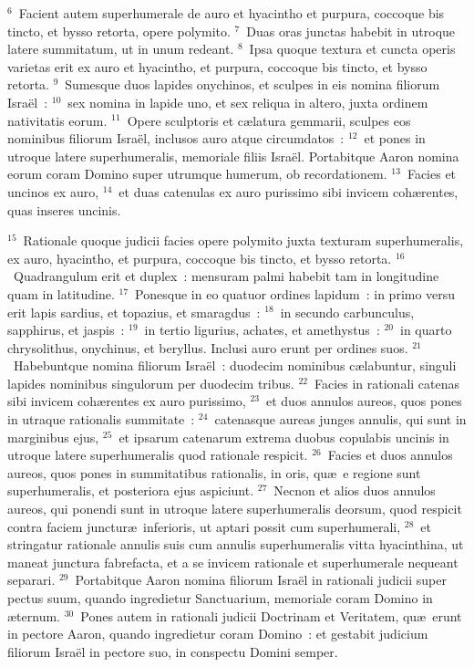 ${}^{6}$~Facient autem superhumerale de auro et hyacintho et purpura, coccoque bis tincto, et bysso retorta, opere polymito.
${}^{7}$~Duas oras junctas habebit in utroque latere summitatum, ut in unum redeant.
${}^{8}$~Ipsa quoque textura et cuncta operis varietas erit ex auro et hyacintho, et purpura, coccoque bis tincto, et bysso retorta.
${}^{9}$~Sumesque duos lapides onychinos, et sculpes in eis nomina filiorum Isra\"el~:
${}^{10}$~sex nomina in lapide uno, et sex reliqua in altero, juxta ordinem nativitatis eorum.
${}^{11}$~Opere sculptoris et c\ae latura gemmarii, sculpes eos nominibus filiorum Isra\"el, inclusos auro atque circumdatos~:
${}^{12}$~et pones in utroque latere superhumeralis, memoriale filiis Isra\"el. Portabitque Aaron nomina eorum coram Domino super utrumque humerum, ob recordationem.
${}^{13}$~Facies et uncinos ex auro,
${}^{14}$~et duas catenulas ex auro purissimo sibi invicem coh\ae rentes, quas inseres uncinis.


${}^{15}$~Rationale quoque judicii facies opere polymito juxta texturam superhumeralis, ex auro, hyacintho, et purpura, coccoque bis tincto, et bysso retorta.
${}^{16}$~Quadrangulum erit et duplex~: mensuram palmi habebit tam in longitudine quam in latitudine.
${}^{17}$~Ponesque in eo quatuor ordines lapidum~: in primo versu erit lapis sardius, et topazius, et smaragdus~:
${}^{18}$~in secundo carbunculus, sapphirus, et jaspis~:
${}^{19}$~in tertio ligurius, achates, et amethystus~:
${}^{20}$~in quarto chrysolithus, onychinus, et beryllus. Inclusi auro erunt per ordines suos.
${}^{21}$~Habebuntque nomina filiorum Isra\"el~: duodecim nominibus c\ae labuntur, singuli lapides nominibus singulorum per duodecim tribus.
${}^{22}$~Facies in rationali catenas sibi invicem coh\ae rentes ex auro purissimo,
${}^{23}$~et duos annulos aureos, quos pones in utraque rationalis summitate~:
${}^{24}$~catenasque aureas junges annulis, qui sunt in marginibus ejus,
${}^{25}$~et ipsarum catenarum extrema duobus copulabis uncinis in utroque latere superhumeralis quod rationale respicit.
${}^{26}$~Facies et duos annulos aureos, quos pones in summitatibus rationalis, in oris, qu\ae\ e regione sunt superhumeralis, et posteriora ejus aspiciunt.
${}^{27}$~Necnon et alios duos annulos aureos, qui ponendi sunt in utroque latere superhumeralis deorsum, quod respicit contra faciem junctur\ae\ inferioris, ut aptari possit cum superhumerali,
${}^{28}$~et stringatur rationale annulis suis cum annulis superhumeralis vitta hyacinthina, ut maneat junctura fabrefacta, et a se invicem rationale et superhumerale nequeant separari.
${}^{29}$~Portabitque Aaron nomina filiorum Isra\"el in rationali judicii super pectus suum, quando ingredietur Sanctuarium, memoriale coram Domino in \ae ternum.
${}^{30}$~Pones autem in rationali judicii Doctrinam et Veritatem, qu\ae\ erunt in pectore Aaron, quando ingredietur coram Domino~: et gestabit judicium filiorum Isra\"el in pectore suo, in conspectu Domini semper.


